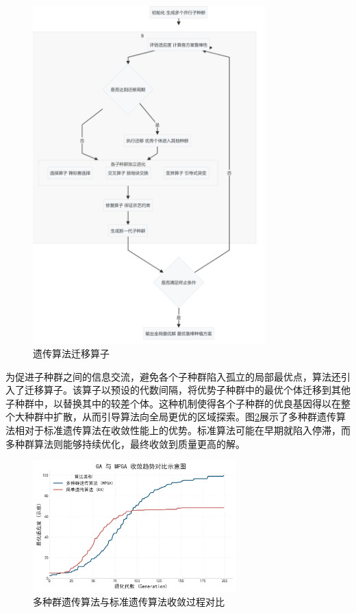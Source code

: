 \begin{figure}[H]
	\centering
	\includegraphics[width=0.8\textwidth]{figs/4问题二/多种群遗传算法.png}
	\caption{遗传算法迁移算子}
	\label{fig:transfer_operator}
\end{figure}



为促进子种群之间的信息交流，避免各个子种群陷入孤立的局部最优点，算法还引入了迁移算子。该算子以预设的代数间隔，将优势子种群中的最优个体迁移到其他子种群中，以替换其中的较差个体。这种机制使得各个子种群的优良基因得以在整个大种群中扩散，从而引导算法向全局更优的区域探索。图\ref{fig:convergence_comparison}展示了多种群遗传算法相对于标准遗传算法在收敛性能上的优势。标准算法可能在早期就陷入停滞，而多种群算法则能够持续优化，最终收敛到质量更高的解。

\begin{figure}[H]
    \centering
    \includegraphics[width=0.7\textwidth]{figs/4问题二/遗传算法收敛对比图.png}

    \caption{多种群遗传算法与标准遗传算法收敛过程对比}
    \label{fig:convergence_comparison}
\end{figure}

